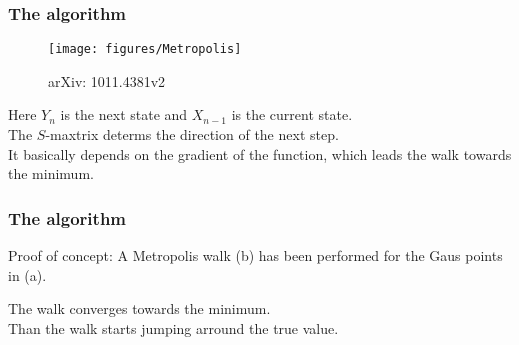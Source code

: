 \documentclass{beamer}
\begin{document}
\begin{frame}
\frametitle{The algorithm}
\begin{figure}
\texttt{[image: figures/Metropolis]}
\caption{arXiv: 1011.4381v2}
\end{figure}
Here $Y_n$ is the next state and $X_{n-1}$ is the current state. \\
The $S$-maxtrix determs the direction of the next step. \\
It basically depends on the gradient of the function, which leads the walk towards the minimum.
\end{frame}

\begin{frame}
\frametitle{The algorithm}
Proof of concept: A Metropolis walk (b) has been performed for the Gaus points in (a).\\
\begin{figure}
\end{figure}
The walk converges towards the minimum. \\
Than the walk starts jumping arround the true value.
\end{frame}


\end{document}
